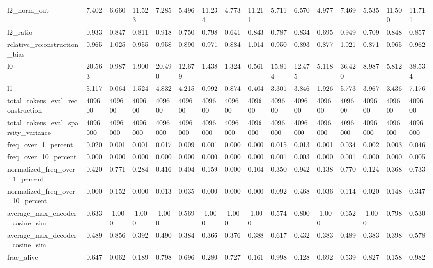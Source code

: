 \begin{table}
\begin{tabular}{llllllllllllllll}
l2_norm_out & 7.402 & 6.660 & 11.523 & 7.285 & 5.496 & 11.234 & 4.773 & 11.211 & 5.711 & 6.570 & 4.977 & 7.469 & 5.535 & 11.500 & 11.711 \\
l2_ratio & 0.933 & 0.847 & 0.811 & 0.918 & 0.750 & 0.798 & 0.641 & 0.843 & 0.787 & 0.834 & 0.695 & 0.949 & 0.709 & 0.848 & 0.857 \\
relative_reconstruction_bias & 0.965 & 1.025 & 0.955 & 0.958 & 0.890 & 0.971 & 0.884 & 1.014 & 0.950 & 0.893 & 0.877 & 1.021 & 0.871 & 0.965 & 0.962 \\
l0 & 20.563 & 0.987 & 1.900 & 20.490 & 12.679 & 1.438 & 1.324 & 0.561 & 15.814 & 12.475 & 5.118 & 36.420 & 8.987 & 5.812 & 38.534 \\
l1 & 5.117 & 0.064 & 1.524 & 4.832 & 4.215 & 0.992 & 0.874 & 0.404 & 3.301 & 3.846 & 1.926 & 5.773 & 3.967 & 3.436 & 7.176 \\
total_tokens_eval_reconstruction & 409600 & 409600 & 409600 & 409600 & 409600 & 409600 & 409600 & 409600 & 409600 & 409600 & 409600 & 409600 & 409600 & 409600 & 409600 \\
total_tokens_eval_sparsity_variance & 4096000 & 4096000 & 4096000 & 4096000 & 4096000 & 4096000 & 4096000 & 4096000 & 4096000 & 4096000 & 4096000 & 4096000 & 4096000 & 4096000 & 4096000 \\
freq_over_1_percent & 0.020 & 0.001 & 0.001 & 0.017 & 0.009 & 0.001 & 0.000 & 0.000 & 0.015 & 0.013 & 0.001 & 0.034 & 0.002 & 0.003 & 0.046 \\
freq_over_10_percent & 0.000 & 0.000 & 0.000 & 0.000 & 0.000 & 0.000 & 0.000 & 0.000 & 0.001 & 0.003 & 0.000 & 0.001 & 0.000 & 0.000 & 0.005 \\
normalized_freq_over_1_percent & 0.420 & 0.771 & 0.284 & 0.416 & 0.404 & 0.159 & 0.000 & 0.104 & 0.350 & 0.942 & 0.138 & 0.770 & 0.124 & 0.368 & 0.733 \\
normalized_freq_over_10_percent & 0.000 & 0.152 & 0.000 & 0.013 & 0.035 & 0.000 & 0.000 & 0.000 & 0.092 & 0.468 & 0.036 & 0.114 & 0.020 & 0.148 & 0.347 \\
average_max_encoder_cosine_sim & 0.633 & -1.000 & -1.000 & -1.000 & 0.569 & -1.000 & -1.000 & -1.000 & 0.574 & 0.800 & -1.000 & 0.652 & -1.000 & 0.798 & 0.530 \\
average_max_decoder_cosine_sim & 0.489 & 0.856 & 0.392 & 0.490 & 0.384 & 0.366 & 0.376 & 0.388 & 0.617 & 0.432 & 0.383 & 0.489 & 0.383 & 0.398 & 0.578 \\
frac_alive & 0.647 & 0.062 & 0.189 & 0.798 & 0.696 & 0.280 & 0.727 & 0.161 & 0.998 & 0.128 & 0.692 & 0.539 & 0.827 & 0.158 & 0.982 \\
\bottomrule
\end{tabular}
\end{table}
